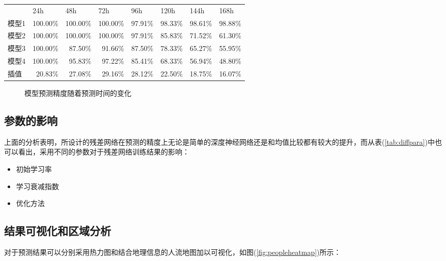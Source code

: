 \begin{table}[htbp]
\begin{tabular}{lrrrrrrr}
          \hline
          & \multicolumn{1}{l}{24h} & \multicolumn{1}{l}{48h} & \multicolumn{1}{l}{72h} & \multicolumn{1}{l}{96h} & \multicolumn{1}{l}{120h} & \multicolumn{1}{l}{144h} & \multicolumn{1}{l}{168h} \\
    模型1   & 100.00\% & 100.00\% & 100.00\% & 97.91\% & 98.33\% & 98.61\% & 98.88\% \\
    模型2   & 100.00\% & 100.00\% & 100.00\% & 97.91\% & 85.83\% & 71.52\% & 61.30\% \\
    模型3   & 100.00\% & 87.50\% & 91.66\% & 87.50\% & 78.33\% & 65.27\% & 55.95\% \\
    模型4   & 100.00\% & 95.83\% & 97.22\% & 85.41\% & 68.33\% & 56.94\% & 48.80\% \\
    插值    & 20.83\% & 27.08\% & 29.16\% & 28.12\% & 22.50\% & 18.75\% & 16.07\% \\
    \hline
    \end{tabular}%
  \label{tab:addlabel}%
\end{table}%

\begin{figure}[ht]
\centering
{}
\hfill
\caption{模型预测精度随着预测时间的变化}
\end{figure}
\subsection*{参数的影响}
上面的分析表明，所设计的残差网络在预测的精度上无论是简单的深度神经网络还是和均值比较都有较大的提升，而从表(\ref{tab:diffpara})中也可以看出，采用不同的参数对于残差网络训练结果的影响：
\begin{itemize}
	\item 初始学习率
	\item 学习衰减指数
	\item 优化方法
\end{itemize}
\subsection{结果可视化和区域分析}
对于预测结果可以分别采用热力图和结合地理信息的人流地图加以可视化，如图(\ref{fig:peopleheatmap})所示：

